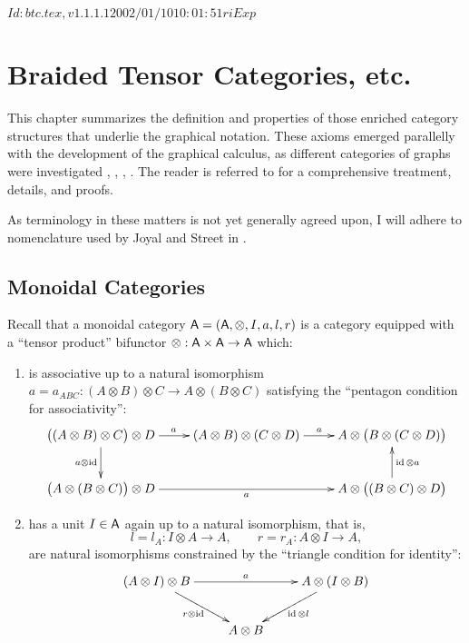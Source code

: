 \RCSID $Id: btc.tex,v 1.1.1.1 2002/01/10 10:01:51 ri Exp $


\chapter{Braided Tensor Categories, etc.}
\label{cha:btc}

This chapter summarizes the definition and properties of those
enriched category structures that underlie the graphical notation.
These axioms emerged parallelly with the development of the graphical
calculus, as different categories of graphs were investigated
\cite{turaev;yang-baxter}, \cite{freyd-yetter;btc},
\cite{joyal-street;tensor-calculus}, \cite{shum;tortile-categories}.
The reader is referred to \cite{joyal-street;btc} for a comprehensive
treatment, details, and proofs.

As terminology in these matters is not yet generally agreed upon, I
will adhere to nomenclature used by Joyal and Street in
\cite{joyal-street;tensor-calculus, joyal-street;btc}. 


\section{Monoidal Categories}
\label{sec:monoidal-categories}

Recall that a monoidal category $\mathsf{A} = (\mathsf{A}, \otimes, I, a, l, r)$ is a
category equipped with a ``tensor product'' bifunctor $\otimes: \mathsf{A} \times \mathsf{A} \to
\mathsf{A}$ which:
\begin{enumerate}
\item is associative up to a natural isomorphism $a = a_{ABC}:
  (A\otimes B)\otimes C \to A\otimes(B\otimes C)$ satisfying the ``pentagon condition for
  associativity'': 
  \begin{equation*}
    \xymatrix{%
      \bigl((A\otimes B)\otimes C\bigr)\otimes D
      &
      (A\otimes B) \otimes (C\otimes D)
      &
      A \otimes \bigl(B\otimes(C\otimes D)\bigr)
      \\
      \bigl(A\otimes(B\otimes C)\bigr) \otimes D
      &
      &
      A\otimes\bigl((B\otimes C)\otimes D\bigr)
      \ar "1,1";"1,2"^{a}
      \ar "1,2";"1,3"^{a}
      \ar "1,1";"2,1"_{a \otimes \id}
      \ar "2,1";"2,3"_{a}
      \ar "2,3";"1,3"_{\id \otimes a}
      }
  \end{equation*}
\item has a unit $I \in \mathsf{A}$ again up to a natural isomorphism, that is,
  \begin{equation*}
    l = l_A: I \otimes A \to A, \qquad r = r_A: A \otimes I \to A,
  \end{equation*}
  are natural isomorphisms constrained by the ``triangle condition for
  identity'':
  \begin{equation*}
    \xymatrix{%
      (A \otimes I) \otimes B
      &
      &
      A \otimes (I \otimes B)
      \\
      &
      A \otimes B
      &
      \ar "1,1";"1,3"^{a}
      \ar "1,1";"2,2"_{r \otimes \id}
      \ar "1,3";"2,2"^{\id \otimes l}
      }
  \end{equation*}
\end{enumerate}

